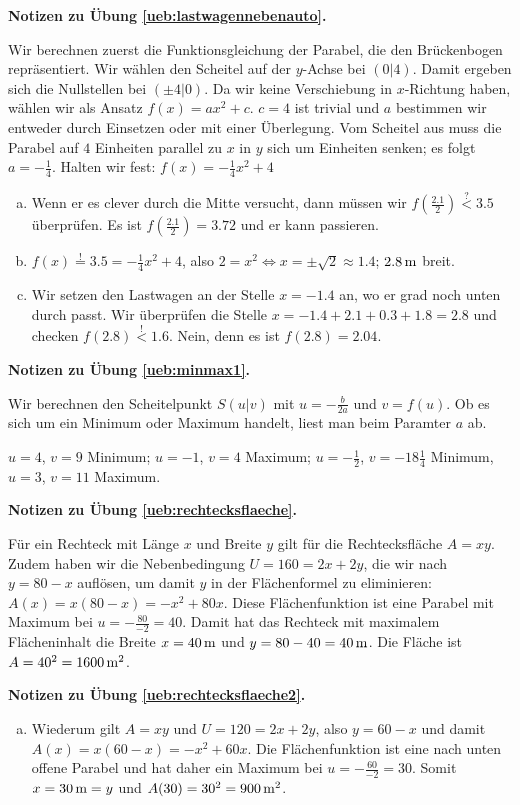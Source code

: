 \documentclass[%
11pt,%
twoside,%
titlepage,%
swissgerman,%
headsepline%
]{scrartcl}
\newcommand{\faReturnGray}{\textcolor{gray}{\faMailReply}} %
\theoremstyle{definition}
\theoremstyle{plain}
\newcommand{\concatueb}[1]{ueb:#1}%
\newcommand{\concatlsg}[1]{lsg:#1}%
\newenvironment{lsg}[1]{%
    \par\noindent\textbf{Notizen zu Übung \ref{\concatueb{#1}}.}%
    \label{\concatlsg{#1}} %
    \hfill\hyperref[\concatueb{#1}]{\faReturnGray}\par %
}{%
    \par%
}
\begin{document}
\begin{lsg}{lastwagennebenauto}
    Wir berechnen zuerst die Funktionsgleichung der Parabel, die den Brückenbogen repräsentiert. Wir wählen den Scheitel auf der $y$-Achse bei $(0|4)$. Damit ergeben sich die Nullstellen bei $(\pm4|0)$. Da wir keine Verschiebung in $x$-Richtung haben, wählen wir als Ansatz $f(x)=ax^2+c$. $c=4$ ist trivial und $a$ bestimmen wir entweder durch Einsetzen oder mit einer Überlegung. Vom Scheitel aus muss die Parabel auf $4$ Einheiten parallel zu $x$ in $y$ sich um Einheiten senken; es folgt $a=-\frac{1}{4}$. Halten wir fest: $f(x)=-\frac{1}{4}x^2+4$

    \begin{enumerate}[a)]
        \item Wenn er es clever durch die Mitte versucht, dann müssen wir $f(\frac{2.1}{2})\stackrel{?}{<}3.5$ überprüfen. Es ist $f(\frac{2.1}{2})=3.72$ und er kann passieren.
        \item $f(x)\stackrel{!}{=}3.5=-\frac{1}{4}x^2+4$, also $2=x^2\Leftrightarrow x=\pm\sqrt{2}\approx1.4$; $\unit[2.8]{m}$ breit.
        \item Wir setzen den Lastwagen an der Stelle $x=-1.4$ an, wo er grad noch unten durch passt. Wir überprüfen die Stelle $x=-1.4+2.1+0.3+1.8=2.8$ und checken $f(2.8)\stackrel{!}{<}1.6$. Nein, denn es ist $f(2.8)=2.04$.
    \end{enumerate}
\end{lsg}
\begin{lsg}{minmax1}
    Wir berechnen den Scheitelpunkt $S(u|v)$ mit $u=-\frac{b}{2a}$ und $v=f(u)$. Ob es sich um ein Minimum oder Maximum handelt, liest man beim Paramter $a$ ab.
    
    $u=4$, $v=9$ Minimum; $u=-1$, $v=4$ Maximum; $u=-\frac{1}{2}$, $v=-18\frac{1}{4}$ Minimum, $u=3$, $v=11$ Maximum.
\end{lsg}
\begin{lsg}{rechtecksflaeche}
    Für ein Rechteck mit Länge $x$ und Breite $y$ gilt für die Rechtecksfläche $A=xy$. Zudem haben wir die Nebenbedingung $U=160=2x+2y$, die wir nach $y=80-x$ auflösen, um damit $y$ in der Flächenformel zu eliminieren: $A(x)=x(80-x)=-x^2+80x$. Diese Flächenfunktion ist eine Parabel mit Maximum bei $u=-\frac{80}{-2}=40$. Damit hat das Rechteck mit maximalem Flächeninhalt die Breite $x=\unit[40]{m}$ und $y=80-40=\unit[40]{m}$. Die Fläche ist $A=40^2=\unit[1600]{m^2}$.
\end{lsg}
\begin{lsg}{rechtecksflaeche2}
    \begin{enumerate}[a)]
        \item Wiederum gilt $A=xy$ und $U=120=2x+2y$, also $y=60-x$ und damit $A(x)=x(60-x)=-x^2+60x$. Die Flächenfunktion ist eine nach unten offene Parabel und hat daher ein Maximum bei $u=-\frac{60}{-2}=30$. Somit $x=\unit[30]{m}=y$ und $A(30)=30^2=\unit[900]{m^2}$.
    \end{enumerate}
\end{lsg}
\end{document}

